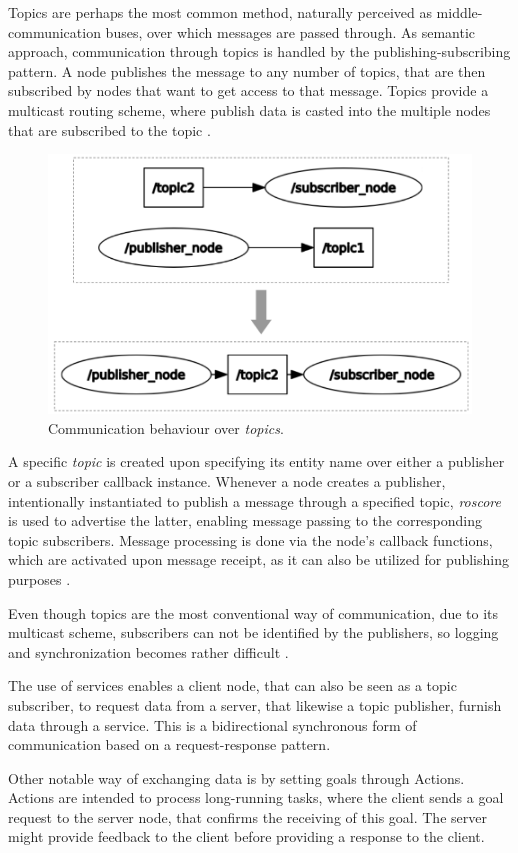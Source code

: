 Topics are perhaps the most common method, naturally perceived as middle-communication buses, over which messages are passed through. As semantic approach, communication through topics is handled by the publishing-subscribing pattern. A node publishes the message to any number of topics, that are then subscribed by nodes that want to get access to that message. Topics provide a multicast routing scheme, where publish data is casted into the multiple nodes that are subscribed to the topic \cite{casini2019response}.

\begin{figure}[H]
    \centering
    \includegraphics[width=0.5\linewidth]{img/ros2-topics.png}
    \caption{Communication behaviour over \textit{topics}.}
    \label{fig:ros2-topics}
\end{figure}

A specific \textit{topic} is created upon specifying its entity name over either a publisher or a subscriber callback instance. Whenever a node creates a publisher, intentionally instantiated to publish a message through a specified topic, \textit{roscore} is used to advertise the latter, enabling message passing to the corresponding topic subscribers. Message processing is done via the node's callback functions, which are activated upon message receipt, as it can also be utilized for publishing purposes \cite{casini2019response}.

Even though topics are the most conventional way of communication, due to its multicast scheme, subscribers can not be identified by the publishers, so logging and synchronization becomes rather difficult \cite{intro-ros}.

The use of services enables a client node, that can also be seen as a topic subscriber, to request data from a server, that likewise a topic publisher, furnish data through a service. This is a bidirectional synchronous form of communication based on a request-response pattern.

Other notable way of exchanging data is by setting goals through Actions. Actions are intended to process long-running tasks, where the client sends a goal request to the server node, that confirms the receiving of this goal. The server might provide feedback to the client before providing a response to the client. 


